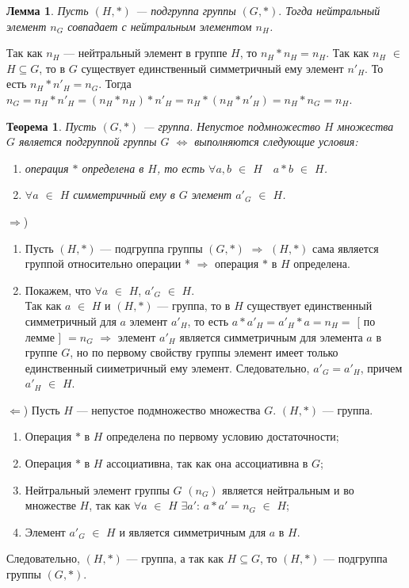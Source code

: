 \newtheorem*{t7_4_1}{Лемма}\begin{t7_4_1} Пусть $(H, *)$ --- подгруппа группы $(G, *).$ Тогда нейтральный элемент $n_G$ совпадает с нейтральным элементом $n_H$. \end{t7_4_1} 
\begin{Proof} Так как $n_H$ --- нейтральный элемент в группе $H$, то $n_H * n_H = n_H$. Так как $n_H$ $\in$ $H\subseteq G$, то в $G$ существует единственный симметричный ему элемент $n'_H$. То есть $n_H * n'_H = n_G$. Тогда $n_G = n_H * n'_H = (n_H * n_H) * n'_H = n_H * (n_H * n'_H) = n_H * n_G = n_H.$ \end{Proof}
\newtheorem*{t7_4_2}{Теорема}\begin{t7_4_2} Пусть $(G, *)$ --- группа. Непустое подмножество $H$ множества $G$ является подгруппой группы $G$ $\Longleftrightarrow$ выполняются следующие условия: \begin{enumerate}
		\item операция $*$ определена в $H$, то есть $\forall$$a, b$ $\in$ $H\quad a * b$ $\in$ $H$. 
		\item $\forall$$a$ $\in$ $H$ симметричный ему в $G$ элемент $a'_G$ $\in$ $H$.
\end{enumerate} \end{t7_4_2} 
\begin{Proof} $\Rightarrow$) \begin{enumerate}
		\item Пусть $(H, *)$ --- подгруппа группы $(G, *)$ $\Rightarrow$ $(H,*)$ сама является группой относительно операции * $\Rightarrow$ операция $*$ в $H$ определена.
		\item Покажем, что $\forall$$a$ $\in$ $H$, $a'_G$ $\in$ $H$.\\ Так как $a$ $\in$ $H$ и $(H,*)$ --- группа, то в $H$ существует единственный симметричный для $a$ элемент $a'_H$, то есть $a * a'_H = a'_H * a = n_H = $ [ по лемме ] $ = n_G$ $\Rightarrow$ элемент $a'_H$ является симметричным для элемента $a$ в группе $G$, но по первому свойству группы элемент имеет только единственный сииметричный ему элемент. Следовательно, $a'_G = a'_H$, причем $a'_H$ $\in$ $H$.
	\end{enumerate}
	$\Leftarrow$) Пусть $H$ --- непустое подмножество множества $G$. $(H, *)$ --- группа. \begin{enumerate}
		\item Операция $*$ в $H$ определена по первому условию достаточности;
		\item Операция $*$ в $H$ ассоциативна, так как она ассоциативна в $G$;
		\item Нейтральный элемент группы $G$ $(n_G)$ является нейтральным и во множестве $H$, так как $\forall$$a$ $\in$ $H$ $\exists$$a'$: $a * a' = n_G$ $\in$ $H$;
		\item Элемент $a'_G$ $\in$ $H$ и является симметричным для $a$ в $H$.
	\end{enumerate}
	Следовательно, $(H,*)$ --- группа, а так как $H\subseteq G$, то $(H,*)$ --- подгруппа группы $(G,*)$.
\end{Proof}
